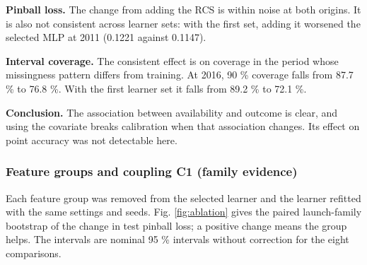 \documentclass[
]{article}
\begin{document}
\textbf{Pinball loss.} The change from adding the RCS is within noise at
both origins. It is also not consistent across learner sets: with the
first set, adding it worsened the selected MLP at 2011 (0.1221 against
0.1147).

\textbf{Interval coverage.} The consistent effect is on coverage in the
period whose missingness pattern differs from training. At 2016, 90 \%
coverage falls from 87.7 \% to 76.8 \%. With the first learner set it
falls from 89.2 \% to 72.1 \%.

\textbf{Conclusion.} The association between availability and outcome is
clear, and using the covariate breaks calibration when that association
changes. Its effect on point accuracy was not detectable here.

\subsubsection{Feature groups and coupling C1 (family
evidence)}\label{sec:res-c1}

Each feature group was removed from the selected learner and the learner
refitted with the same settings and seeds. Fig. \ref{fig:ablation} gives
the paired launch-family bootstrap of the change in test pinball loss; a
positive change means the group helps. The intervals are nominal 95 \%
intervals without correction for the eight comparisons.
\end{document}
